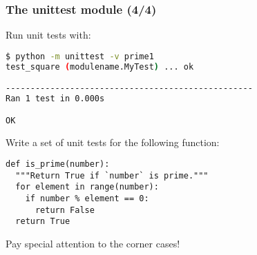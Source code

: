 \documentclass[english,serif,mathserif,xcolor=pdftex,dvipsnames,table]{beamer}
\begin{document}
\begin{frame}[fragile]
\frametitle{The unittest module (4/4)}
Run unit tests with:
\+
  \begin{lstlisting}[language=sh]
$ python -m unittest -v prime1
test_square (modulename.MyTest) ... ok

--------------------------------------------------
Ran 1 test in 0.000s

OK
\end{lstlisting}
\end{frame}


\begin{frame}[fragile]
  \begin{exercise}
    Write a set of unit tests for the following function:
\begin{lstlisting}
def is_prime(number):
  """Return True if `number` is prime."""
  for element in range(number):
    if number % element == 0:
      return False
  return True
\end{lstlisting}
    Pay special attention to the corner cases!
  \end{exercise}
\end{frame}
\end{document}
